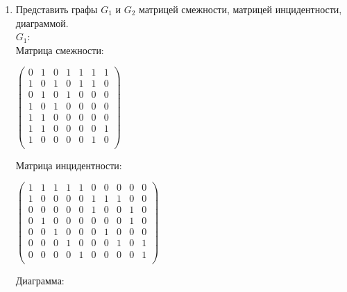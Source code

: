 \documentclass[a4paper,14pt]{extarticle}
\begin{document}
\begin{enumerate}[1.]
    \item Представить графы $G_1$ и $G_2$ матрицей смежности,
          матрицей инцидентности, диаграммой.\\
          $G_1$:\\
          Матрица смежности:\\
          \begin{center}
              $\begin{pmatrix}
                      0 & 1 & 0 & 1 & 1 & 1 & 1 \\
                      1 & 0 & 1 & 0 & 1 & 1 & 0 \\
                      0 & 1 & 0 & 1 & 0 & 0 & 0 \\
                      1 & 0 & 1 & 0 & 0 & 0 & 0 \\
                      1 & 1 & 0 & 0 & 0 & 0 & 0 \\
                      1 & 1 & 0 & 0 & 0 & 0 & 1 \\
                      1 & 0 & 0 & 0 & 0 & 1 & 0 \\
                  \end{pmatrix}$
          \end{center}
          \bigbreak
          Матрица инцидентности:\\
          \begin{center}
              $\begin{pmatrix}
                      1 & 1 & 1 & 1 & 1 & 0 & 0 & 0 & 0 & 0 \\
                      1 & 0 & 0 & 0 & 0 & 1 & 1 & 1 & 0 & 0 \\
                      0 & 0 & 0 & 0 & 0 & 1 & 0 & 0 & 1 & 0 \\
                      0 & 1 & 0 & 0 & 0 & 0 & 0 & 0 & 1 & 0 \\
                      0 & 0 & 1 & 0 & 0 & 0 & 1 & 0 & 0 & 0 \\
                      0 & 0 & 0 & 1 & 0 & 0 & 0 & 1 & 0 & 1 \\
                      0 & 0 & 0 & 0 & 1 & 0 & 0 & 0 & 0 & 1 \\
                  \end{pmatrix}$
          \end{center}\bigbreak
          Диаграмма:\\
          \begin{center}

\end{center}
\end{enumerate}
\end{document}
